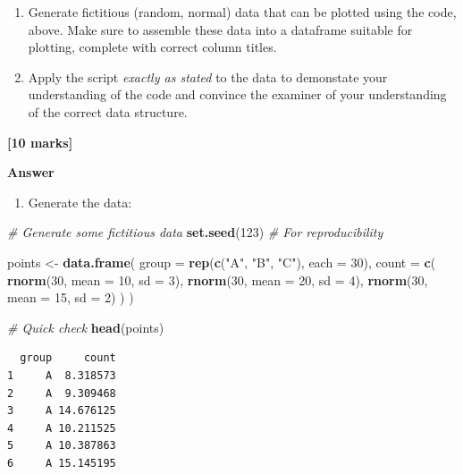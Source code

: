 \documentclass[
  10t,
]{article}
\newenvironment{Shaded}{\begin{snugshade}}{\end{snugshade}}
\newcommand{\AttributeTok}[1]{\textcolor[rgb]{0.13,0.29,0.53}{#1}}
\newcommand{\CommentTok}[1]{\textcolor[rgb]{0.56,0.35,0.01}{\textit{#1}}}
\newcommand{\DecValTok}[1]{\textcolor[rgb]{0.00,0.00,0.81}{#1}}
\newcommand{\FunctionTok}[1]{\textcolor[rgb]{0.13,0.29,0.53}{\textbf{#1}}}
\newcommand{\NormalTok}[1]{#1}
\newcommand{\OtherTok}[1]{\textcolor[rgb]{0.56,0.35,0.01}{#1}}
\newcommand{\StringTok}[1]{\textcolor[rgb]{0.31,0.60,0.02}{#1}}
\providecommand{\tightlist}{%
  \setlength{\itemsep}{0pt}\setlength{\parskip}{0pt}}\usepackage{longtable,booktabs,array}
\begin{document}
\begin{enumerate}
\def\labelenumi{\alph{enumi}.}
\tightlist
\item
  Generate fictitious (random, normal) data that can be plotted using
  the code, above. Make sure to assemble these data into a dataframe
  suitable for plotting, complete with correct column titles.
\item
  Apply the script \emph{exactly as stated} to the data to demonstate
  your understanding of the code and convince the examiner of your
  understanding of the correct data structure.
\end{enumerate}

\textbf{{[}10 marks{]}}

\textbf{Answer}

\begin{enumerate}
\def\labelenumi{\alph{enumi}.}
\tightlist
\item
  Generate the data:
\end{enumerate}

\begin{Shaded}
\begin{Highlighting}[]
\CommentTok{\# Generate some fictitious data}
\FunctionTok{set.seed}\NormalTok{(}\DecValTok{123}\NormalTok{)  }\CommentTok{\# For reproducibility}

\NormalTok{points }\OtherTok{\textless{}{-}} \FunctionTok{data.frame}\NormalTok{(}
  \AttributeTok{group =} \FunctionTok{rep}\NormalTok{(}\FunctionTok{c}\NormalTok{(}\StringTok{"A"}\NormalTok{, }\StringTok{"B"}\NormalTok{, }\StringTok{"C"}\NormalTok{), }\AttributeTok{each =} \DecValTok{30}\NormalTok{),}
  \AttributeTok{count =} \FunctionTok{c}\NormalTok{(}
    \FunctionTok{rnorm}\NormalTok{(}\DecValTok{30}\NormalTok{, }\AttributeTok{mean =} \DecValTok{10}\NormalTok{, }\AttributeTok{sd =} \DecValTok{3}\NormalTok{),}
    \FunctionTok{rnorm}\NormalTok{(}\DecValTok{30}\NormalTok{, }\AttributeTok{mean =} \DecValTok{20}\NormalTok{, }\AttributeTok{sd =} \DecValTok{4}\NormalTok{),}
    \FunctionTok{rnorm}\NormalTok{(}\DecValTok{30}\NormalTok{, }\AttributeTok{mean =} \DecValTok{15}\NormalTok{, }\AttributeTok{sd =} \DecValTok{2}\NormalTok{)}
\NormalTok{  )}
\NormalTok{)}

\CommentTok{\# Quick check}
\FunctionTok{head}\NormalTok{(points)}
\end{Highlighting}
\end{Shaded}

\begin{verbatim}
  group     count
1     A  8.318573
2     A  9.309468
3     A 14.676125
4     A 10.211525
5     A 10.387863
6     A 15.145195
\end{verbatim}
\end{document}
